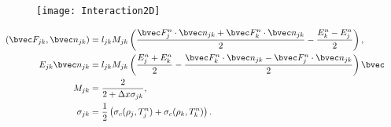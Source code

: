 \begin{frame}
\begin{columns}[t]
\begin{column}{0.6\textwidth}
      \end{column}
      \begin{column}{0.4\textwidth}
        \begin{figure}[T]
        \texttt{[image: Interaction2D]}       
        \end{figure}
        \vspace*{-0.7cm}
         \begin{center}
          \small
          \begin{align*}
            \left(\bvec F_{jk}, \bvec n_{jk} \right) &= l_{jk} M_{jk} \left( \frac{\bvec F_j^n \cdot \bvec n_{jk} + \bvec F_k^n \cdot \bvec n_{jk}}{2} - \frac{E_k^n - E_j^n}{2} \right) ,\\
            E_{jk} \bvec n_{jk} &= l_{jk} M_{jk} \left( \frac{E_j^n + E_k^n}{2} - \frac{\bvec F_k^n \cdot \bvec n_{jk} - \bvec F_j^n \cdot \bvec n_{jk}}{2} \right) \bvec n_{jk} ,\\
            M_{jk} &= \frac{2}{2 + \Delta x \sigma_{jk}} , \\
            \sigma_{jk} &= \frac{1}{2} \left( \sigma_c(\rho_j,T_j^n) + \sigma_c(\rho_k,T_k^n) \right) .
           \end{align*}
         \end{center}
      \end{column}
     \end{columns}
  \end{frame}
  
